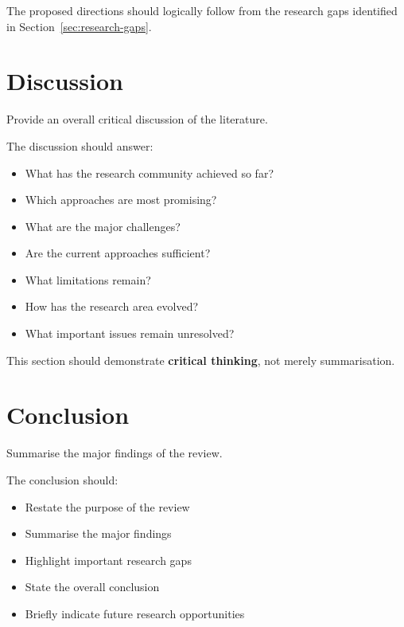 \documentclass[12pt,a4paper]{article}
\begin{document}
The proposed directions should logically follow from the research gaps identified in Section~\ref{sec:research-gaps}.



\section{Discussion}

Provide an overall critical discussion of the literature.

The discussion should answer:

\begin{itemize}
    \item What has the research community achieved so far?
    \item Which approaches are most promising?
    \item What are the major challenges?
    \item Are the current approaches sufficient?
    \item What limitations remain?
    \item How has the research area evolved?
    \item What important issues remain unresolved?
\end{itemize}

This section should demonstrate \textbf{critical thinking}, not merely summarisation.



\section{Conclusion}

Summarise the major findings of the review.

The conclusion should:

\begin{itemize}
    \item Restate the purpose of the review
    \item Summarise the major findings
    \item Highlight important research gaps
    \item State the overall conclusion
    \item Briefly indicate future research opportunities
\end{itemize}
\end{document}
